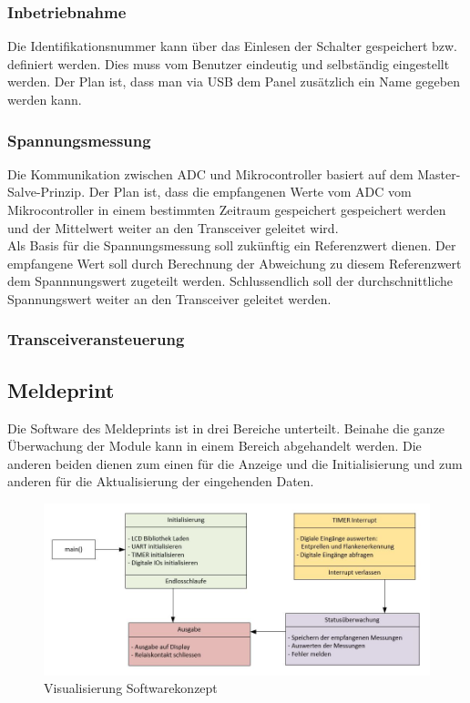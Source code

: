\subsubsection{Inbetriebnahme}
Die Identifikationsnummer kann über das Einlesen der Schalter gespeichert bzw. definiert werden. Dies muss vom Benutzer eindeutig und selbständig eingestellt werden. Der Plan ist, dass man via USB dem Panel zusätzlich ein Name gegeben werden kann.
\subsubsection{Spannungsmessung}
Die Kommunikation zwischen ADC und Mikrocontroller basiert auf dem Master-Salve-Prinzip. Der Plan ist, dass die empfangenen Werte vom ADC vom Mikrocontroller in einem bestimmten Zeitraum gespeichert gespeichert werden und der Mittelwert weiter an den Transceiver geleitet wird.\\
Als Basis für die Spannungsmessung soll zukünftig ein Referenzwert dienen. Der empfangene Wert soll durch Berechnung der Abweichung zu diesem Referenzwert dem Spannnungswert zugeteilt werden. Schlussendlich soll der durchschnittliche Spannungswert weiter an den Transceiver geleitet werden.
\subsubsection{Transceiveransteuerung}
















\newpage
\subsection{Meldeprint}
Die Software des Meldeprints ist in drei Bereiche unterteilt. Beinahe die ganze Überwachung der Module kann in einem Bereich abgehandelt werden. Die anderen beiden dienen zum einen für die Anzeige und die Initialisierung und zum anderen für die Aktualisierung der eingehenden Daten.

\begin{figure}[htbp] 
  \centering
     \includegraphics[width=1\textwidth]{graphics/reportboard-software-river}
  \caption{Visualisierung Softwarekonzept}
  \label{fig:reportboard-software-river}
\end{figure}

